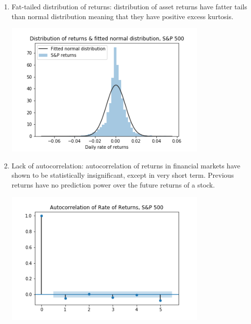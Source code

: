 \begin{enumerate}
    \item Fat-tailed distribution of returns: distribution of asset returns have fatter tails than normal distribution meaning that they have positive excess kurtosis. 
    \par
    \begin{minipage}{\linewidth}
        \centering
        \includegraphics[width=10cm]{plots/S&P500_fat_tails.png}
        \label{fig:sp_fat_tails}
    \end{minipage}

    \item Lack of autocorrelation: autocorrelation of returns in financial markets have shown to be statistically insignificant, except in very short term. Previous returns have no prediction power over the future returns of a stock. 
    \par
    \begin{minipage}{\linewidth}
        \centering
        \includegraphics[width=10cm]{plots/S&P500_autocorr.png}
        \label{fig:sp_autocorr}
    \end{minipage}


\end{enumerate}
